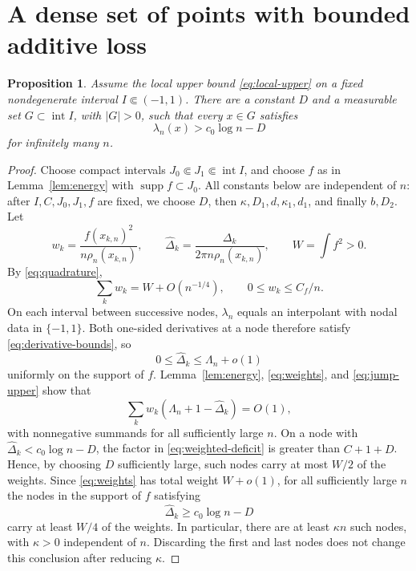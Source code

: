 \documentclass[11pt]{article}
\newtheorem{proposition}[theorem]{Proposition}
\theoremstyle{remark}
\numberwithin{equation}{section}
\DeclareMathOperator{\supp}{supp}
\begin{document}
\section{A dense set of points with bounded additive loss}\label{sec:fixed}

\begin{proposition}\label{prop:recurrence}
Assume the local upper bound \eqref{eq:local-upper} on a fixed
nondegenerate interval \(I\Subset(-1,1)\). There are a constant \(D\)
and a measurable set \(G\subset\operatorname{int}I\), with \(|G|>0\),
such that every \(x\in G\) satisfies
\[
 \lambda_n(x)>c_0\log n-D
\]
for infinitely many \(n\).
\end{proposition}

\begin{proof}
Choose compact intervals \(J_0\Subset J_1\Subset\operatorname{int}I\), and
choose \(f\) as in Lemma~\ref{lem:energy} with \(\supp f\subset J_0\).
All constants below are independent of \(n\): after \(I,C,J_0,J_1,f\) are
fixed, we choose \(D\), then \(\kappa,D_1,d,\kappa_1,d_1\), and finally
\(b,D_2\). Let
\[
 w_k=\frac{f(x_{k,n})^2}{n\rho_n(x_{k,n})},\qquad
 \widehat\Delta_k=\frac{\Delta_k}{2\pi n\rho_n(x_{k,n})},\qquad W=\int f^2>0.
\]
By \eqref{eq:quadrature},
\begin{equation}\label{eq:weights}
 \sum_kw_k=W+O(n^{-1/4}),\qquad 0\le w_k\le C_f/n.
\end{equation}
On each interval between successive nodes, \(\lambda_n\) equals an interpolant
with nodal data in \(\{-1,1\}\). Both one-sided derivatives at a node
therefore satisfy \eqref{eq:derivative-bounds}, so
\begin{equation}\label{eq:jump-upper}
 0\le\widehat\Delta_k\le\Lambda_n+o(1)
\end{equation}
uniformly on the support of \(f\). Lemma~\ref{lem:energy}, \eqref{eq:weights},
and \eqref{eq:jump-upper} show that
\begin{equation}\label{eq:weighted-deficit}
 \sum_kw_k(\Lambda_n+1-\widehat\Delta_k)=O(1),
\end{equation}
with nonnegative summands for all sufficiently large \(n\). On a node with
\(\widehat\Delta_k<c_0\log n-D\), the factor in \eqref{eq:weighted-deficit} is greater
than \(C+1+D\). Hence, by choosing \(D\) sufficiently large, such nodes
carry at most \(W/2\) of the weights. Since \eqref{eq:weights} has total
weight \(W+o(1)\), for all
sufficiently large \(n\) the nodes in the support of \(f\) satisfying
\begin{equation}\label{eq:large-jump}
 \widehat\Delta_k\ge c_0\log n-D
\end{equation}
carry at least \(W/4\) of the weights. In particular, there are at least
\(\kappa n\) such nodes, with \(\kappa>0\) independent of \(n\). Discarding the first and last nodes does not change this conclusion
after reducing \(\kappa\).


\end{proof}
\end{document}

